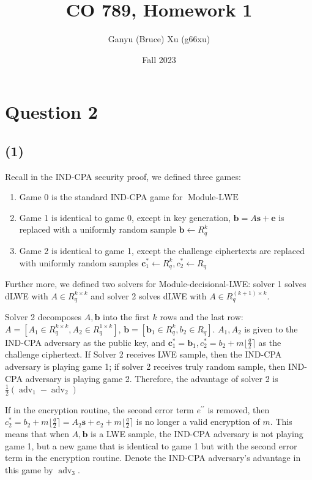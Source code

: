 \documentclass{article}
\title{CO 789, Homework 1}
\author{Ganyu (Bruce) Xu (g66xu)}
\date{Fall 2023}
\newcommand{\round}[1]{\lfloor {#1} \rceil}
\begin{document}

\section*{Question 2}

\subsection*{(1)}
Recall in the IND-CPA security proof, we defined three games:

\begin{enumerate}
    \item Game 0 is the standard IND-CPA game for $\operatorname{Module-LWE}$
    \item Game 1 is identical to game 0, except in key generation, $\mathbf{b} = A\mathbf{s} + \mathbf{e}$ is replaced with a uniformly random sample $\mathbf{b} \leftarrow R_q^k$
    \item Game 2 is identical to game 1, except the challenge ciphertexts are replaced with uniformly random samples $\mathbf{c}_1^\ast \leftarrow R_q^k, c_2^\ast \leftarrow R_q$
\end{enumerate}

Further more, we defined two solvers for Module-decisional-LWE: solver 1 solves dLWE with $A \in R_q^{k \times k}$ and solver 2 solves dLWE with $A \in R_q^{(k+1) \times k}$.

Solver 2 decomposes $A, \mathbf{b}$ into the first $k$ rows and the last row: $A = [A_1 \in R_q^{k \times k},  A_2 \in R_q^{1 \times k}]$, $\mathbf{b} = [\mathbf{b}_1\in R_q^{k}, b_2 \in R_q]$. $A_1, A_2$ is given to the IND-CPA adversary as the public key, and $\mathbf{c}_1^\ast = \mathbf{b}_1, c_2^\ast = b_2 + m \round{\frac{q}{2}}$ as the challenge ciphertext. If Solver 2 receives LWE sample, then the IND-CPA adversary is playing game 1; if solver 2 receives truly random sample, then IND-CPA adversary is playing game 2. Therefore, the advantage of solver 2 is $\frac{1}{2}(\operatorname{adv}_1 - \operatorname{adv}_2)$

If in the encryption routine, the second error term $e^{\prime\prime}$ is removed, then $c_2^\ast = b_2 + m\round{\frac{q}{2}} = A_2\mathbf{s} + e_2 + m\round{\frac{q}{2}}$ is no longer a valid encryption of $m$. This means that when $A, \mathbf{b}$ is a LWE sample, the IND-CPA adversary is not playing game 1, but a new game that is identical to game 1 but with the second error term in the encryption routine. Denote the IND-CPA adversary's advantage in this game by $\operatorname{adv}_3$.
\end{document}
